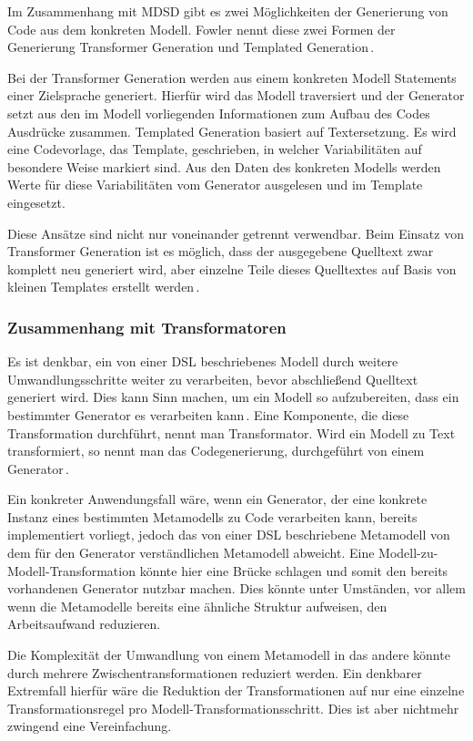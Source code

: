 \documentclass[12pt,oneside,a4paper,parskip]{scrbook}
\begin{document}
Im Zusammenhang mit MDSD gibt es zwei Möglichkeiten der Generierung von Code aus dem konkreten Modell. Fowler nennt diese zwei Formen der Generierung Transformer Generation und Templated Generation\,\cite[S. 124f.]{fowler2010}.

Bei der Transformer Generation werden aus einem konkreten Modell Statements einer Zielsprache generiert. Hierfür wird das Modell traversiert und der Generator setzt aus den im Modell vorliegenden Informationen zum Aufbau des Codes Ausdrücke zusammen. Templated Generation basiert auf Textersetzung. Es wird eine Codevorlage, das Template, geschrieben, in welcher Variabilitäten auf besondere Weise markiert sind. Aus den Daten des konkreten Modells werden Werte für diese Variabilitäten vom Generator ausgelesen und im Template eingesetzt.

Diese Ansätze sind nicht nur voneinander getrennt verwendbar. Beim Einsatz von Transformer Generation ist es möglich, dass der ausgegebene Quelltext zwar komplett neu generiert wird, aber einzelne Teile dieses Quelltextes auf Basis von kleinen Templates erstellt werden\,\cite[S. 125]{fowler2010}.

\subsubsection{Zusammenhang mit Transformatoren}

Es ist denkbar, ein von einer DSL beschriebenes Modell durch weitere Umwandlungsschritte weiter zu verarbeiten, bevor abschließend Quelltext generiert wird. Dies kann Sinn machen, um ein Modell so aufzubereiten, dass ein bestimmter Generator es verarbeiten kann\,\cite[S. 195]{stahl2007}. Eine Komponente, die diese Transformation durchführt, nennt man Transformator. Wird ein Modell zu Text transformiert, so nennt man das Codegenerierung, durchgeführt von einem Generator\,\cite[S. 271]{voelter2013}.

Ein konkreter Anwendungsfall wäre, wenn ein Generator, der eine konkrete Instanz eines bestimmten Metamodells zu Code verarbeiten kann, bereits implementiert vorliegt, jedoch das von einer DSL beschriebene Metamodell von dem für den Generator verständlichen Metamodell abweicht. Eine Modell-zu-Modell-Transformation könnte hier eine Brücke schlagen und somit den bereits vorhandenen Generator nutzbar machen. Dies könnte unter Umständen, vor allem wenn die Metamodelle bereits eine ähnliche Struktur aufweisen, den Arbeitsaufwand reduzieren.

Die Komplexität der Umwandlung von einem Metamodell in das andere könnte durch mehrere Zwischentransformationen reduziert werden. Ein denkbarer Extremfall hierfür wäre die Reduktion der Transformationen auf nur eine einzelne Transformationsregel pro Modell-Transformationsschritt. Dies ist aber nichtmehr zwingend eine Vereinfachung.
\end{document}
